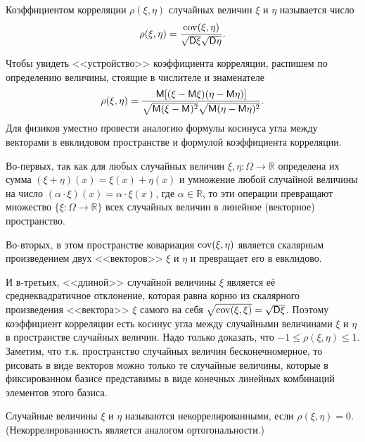 \begin{definition}
	Коэффициентом корреляции $\rho(\xi, \eta)$ случайных величин $\xi$ и $\eta$ называется число
	\begin{equation*}
		\rho(\xi,\eta)=\frac{\operatorname{cov}(\xi,\eta)}{\sqrt{\mathsf{D}\xi}\sqrt{\mathsf{D}\eta}}.
	\end{equation*}
\end{definition}
\begin{zam}\label{zam:19.8}
	Чтобы увидеть <<устройство>> коэффициента корреляции, распишем по определению величины, стоящие в числителе и знаменателе
	\begin{equation*}
		\rho(\xi, \eta)=\frac{\mathsf{M}[(\xi-\mathsf{M} \xi)(\eta-\mathsf{M}\eta)]}
		{\sqrt{\mathsf{M}(\xi-\mathsf{M})^2}\sqrt{\mathsf{M}(\eta-\mathsf{M}\eta)^2}}.
	\end{equation*}
		Для физиков уместно провести аналогию формулы косинуса угла между
	векторами в евклидовом пространстве и формулой коэффициента корреляции.
	
	Во-первых, так как для любых случайных величин 
	$\xi, \eta : \Omega \to \mathbb{R}$ определена их сумма 
	$(\xi +\eta)(x) = \xi(x)+\eta(x)$ и умножение любой случайной величины на число 
	$(\alpha \cdot \xi)(x) = \alpha \cdot \xi(x)$, где $\alpha \in \mathbb{R}$, то эти операции превращают
	множество $\{\xi : \Omega \to \mathbb{R}\}$ всех случайных величин в линейное (векторное)	пространство.
	
	Во-вторых, в этом пространстве ковариация $\operatorname{cov}(\xi, \eta)$ является скалярным произведением двух <<векторов>> $\xi$ и $\eta$ и превращает его в евклидово.

	И в-третьих, <<длиной>> случайной величины $\xi$ является её среднеквадратичное отклонение, которая равна корню из скалярного произведения <<вектора>> $\xi$ самого на себя
	$\sqrt{\operatorname{cov}(\xi, \xi)}=\sqrt{\mathsf{D}\xi}$. Поэтому коэффициент корреляции есть косинус угла между случайными величинами $\xi$ и $\eta$ в пространстве случайных величин. Надо только доказать, что $−1 \leqslant \rho(\xi, \eta) \leqslant 1$. Заметим, что т.к. пространство случайных величин бесконечномерное, то рисовать в виде векторов можно только те случайные величины, которые	в фиксированном базисе представимы в виде конечных линейных комбинаций элементов этого базиса.
\end{zam}

\begin{definition}
	Случайные величины $\xi$ и $\eta$ называются некоррелированными, если $\rho(\xi, \eta) = 0$. (Некоррелированность является аналогом
ортогональности.)
\end{definition}

